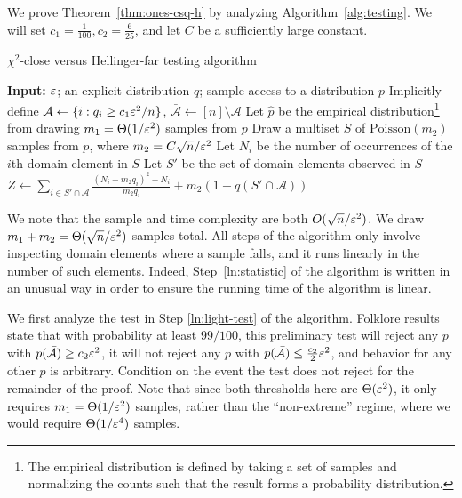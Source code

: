 We prove Theorem~\ref{thm:ones-csq-h} by analyzing Algorithm~\ref{alg:testing}.
We will set $c_1 = \frac{1}{100}, c_2 = \frac{6}{25}$, and let $C$ be a sufficiently large constant.
\begin{algorithm}[h]
\caption{$\chi^2$-close versus Hellinger-far testing algorithm}\label{alg:testing}
\begin{algorithmic}[1]
\State \textbf{Input:} $\varepsilon$; an explicit distribution $q$; sample access to a distribution $p$
\State Implicitly define $\mathcal{A} \leftarrow \{i:q_i \geq c_1\varepsilon^2/n\}$, $\mathcal{\bar A} \leftarrow [n] \setminus \mathcal{A}$
\State Let $\hat p$ be the empirical distribution\footnote{The empirical distribution is defined by taking a set of samples and normalizing the counts such that the result forms a probability distribution.} from drawing $m_1 = \Theta(1/\varepsilon^2)$ samples from $p$
 \label{ln:light-test}
\State \Return \reject \label{ln:early-reject}
\EndIf
\State Draw a multiset $S$ of $\mathrm{Poisson}(m_2)$ samples from $p$, where $m_2 = C\sqrt{n}/\varepsilon^2$
\State Let $N_i$ be the number of occurrences of the $i$th domain element in $S$
\State Let $S'$ be the set of domain elements observed in $S$
\State $Z \leftarrow \sum_{i \in S' \cap \mathcal{A}} \frac{(N_i - m_2q_i)^2 - N_i}{m_2q_i} + m_2 (1 - q(S' \cap \mathcal{A}))$ \label{ln:statistic}
\State \Return \accept
\Else 
\State \Return \reject
\EndIf 
\end{algorithmic}
\end{algorithm}

We note that the sample and time complexity are both $O(\sqrt{n}/\varepsilon^2)$.
We draw $m_1 + m_2 = \Theta(\sqrt{n}/\varepsilon^2)$ samples total.
All steps of the algorithm only involve inspecting domain elements where a sample falls, and it runs linearly in the number of such elements.
Indeed, Step~\ref{ln:statistic} of the algorithm is written in an unusual way in order to ensure the running time of the algorithm is linear.

We first analyze the test in Step \ref{ln:light-test} of the algorithm.
Folklore results state that with probability at least $99/100$, this preliminary test will reject any $p$ with $p(\mathcal{\bar A}) \geq c_2 \varepsilon^2$, it will not reject any $p$ with $p(\mathcal{\bar A}) \leq \frac{c_2}{2} \varepsilon^2$, and behavior for any other $p$ is arbitrary.
Condition on the event the test does not reject for the remainder of the proof.
Note that since both thresholds here are $\Theta(\varepsilon^2)$, it only requires $m_1 = \Theta(1/\varepsilon^2)$ samples, rather than the ``non-extreme'' regime, where we would require $\Theta(1/\varepsilon^4)$ samples.

